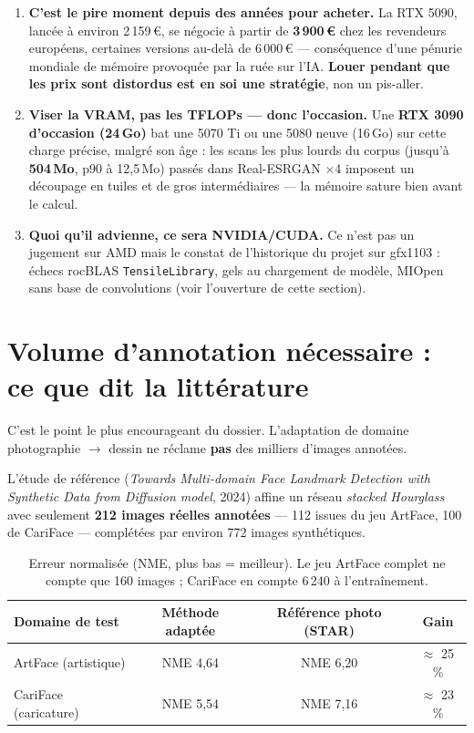 \documentclass[11pt,a4paper]{article}
\newcommand{\alerte}[1]{\textcolor{alerte}{\textbf{#1}}}
\begin{document}
\begin{enumerate}[leftmargin=*,itemsep=5pt]
  \item \alerte{C'est le pire moment depuis des années pour acheter.} La
  RTX 5090, lancée à environ 2\,159\,\euro{}, se négocie à partir de
  \textbf{3\,900\,\euro{}} chez les revendeurs européens, certaines versions
  au-delà de 6\,000\,\euro{} — conséquence d'une pénurie mondiale de mémoire
  provoquée par la ruée sur l'IA. \textbf{Louer pendant que les prix sont
  distordus est en soi une stratégie}, non un pis-aller.

  \item \alerte{Viser la VRAM, pas les TFLOPs --- donc l'occasion.} Une
  \textbf{RTX 3090 d'occasion (24\,Go)} bat une 5070 Ti ou une 5080 neuve
  (16\,Go) sur cette charge précise, malgré son âge : les scans les plus lourds
  du corpus (jusqu'à \textbf{504\,Mo}, p90 à 12,5\,Mo) passés dans
  Real-ESRGAN $\times$4 imposent un découpage en tuiles et de gros
  intermédiaires — la mémoire sature bien avant le calcul.

  \item \alerte{Quoi qu'il advienne, ce sera NVIDIA/CUDA.} Ce n'est pas un
  jugement sur AMD mais le constat de l'historique du projet sur gfx1103 :
  échecs rocBLAS \texttt{TensileLibrary}, gels au chargement de modèle, MIOpen
  sans base de convolutions (voir l'ouverture de cette section).
\end{enumerate}

\section{Volume d'annotation nécessaire : ce que dit la littérature}

C'est le point le plus encourageant du dossier. L'adaptation de domaine
photographie $\rightarrow$ dessin ne réclame \textbf{pas} des milliers d'images
annotées.

L'étude de référence (\emph{Towards Multi-domain Face Landmark Detection with
Synthetic Data from Diffusion model}, 2024) affine un réseau \emph{stacked
Hourglass} avec seulement \textbf{212 images réelles annotées} — 112 issues du
jeu ArtFace, 100 de CariFace — complétées par environ 772 images synthétiques.

\begin{table}[h]
\centering
\small
\begin{tabular}{lccc}
\toprule
\textbf{Domaine de test} & \textbf{Méthode adaptée} & \textbf{Référence photo (STAR)} & \textbf{Gain} \\
\midrule
ArtFace (artistique)  & NME 4,64 & NME 6,20 & $\approx$ 25\,\% \\
CariFace (caricature) & NME 5,54 & NME 7,16 & $\approx$ 23\,\% \\
\bottomrule
\end{tabular}
\caption{Erreur normalisée (NME, plus bas = meilleur). Le jeu ArtFace complet ne
compte que 160 images ; CariFace en compte 6\,240 à l'entraînement.}
\end{table}
\end{document}
